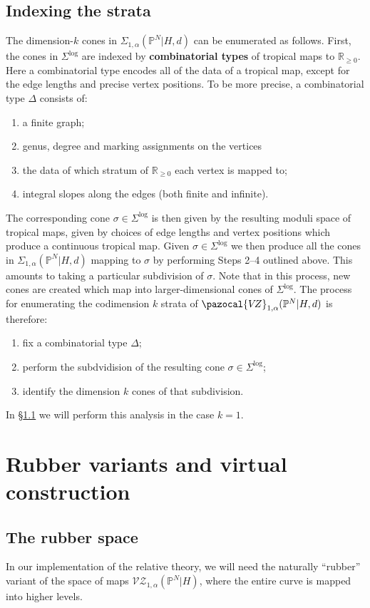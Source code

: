 \documentclass[11pt]{amsart}
\newcommand{\PP}{\mathbb P}
\newcommand{\VZ}{\pazocal{V\!Z}}
\newcommand{\RR}{\mathbb{R}}
\theoremstyle{definition}
\theoremstyle{definition}
\begin{document}
\subsection{Indexing the strata} The dimension-$k$ cones in $\Sigma_{1,\alpha}(\PP^N|H,d)$ can be enumerated as follows. First, the cones in $\Sigma^{\operatorname{log}}$ are indexed by \textbf{combinatorial types} of tropical maps to $\RR_{\geq 0}$. Here a combinatorial type encodes all of the data of a tropical map, except for the edge lengths and precise vertex positions. To be more precise, a combinatorial type $\Delta$ consists of:
\begin{enumerate}
\item a finite graph;
\item genus, degree and marking assignments on the vertices
\item the data of which stratum of $\RR_{\geq 0}$ each vertex is mapped to;
\item integral slopes along the edges (both finite and infinite).
\end{enumerate}
The corresponding cone $\sigma \in \Sigma^{\operatorname{log}}$ is then given by the resulting moduli space of tropical maps, given by choices of edge lengths and vertex positions which produce a continuous tropical map. Given $\sigma\in \Sigma^{\operatorname{log}}$ we then produce all the cones in $\Sigma_{1,\alpha}(\PP^N|H,d)$ mapping to $\sigma$ by performing Steps 2--4 outlined above. This amounts to taking a particular subdivision of $\sigma$. Note that in this process, new cones are created which map into larger-dimensional cones of $\Sigma^{\operatorname{log}}$. The process for enumerating the codimension $k$ strata of $\VZ_{1,\alpha}(\PP^N|H,d)$ is therefore:
\begin{enumerate}
\item fix a combinatorial type $\Delta$;
\item perform the subdvidision of the resulting cone $\sigma \in \Sigma^{\operatorname{log}}$;
\item identify the dimension $k$ cones of that subdivision.
\end{enumerate}
In \S \ref{} we will perform this analysis in the case $k=1$.

\section{Rubber variants and virtual construction}

\subsection{The rubber space} In our implementation of the relative theory, we will need the naturally ``rubber'' variant of the space of maps $
\mathcal{VZ}_{1,\alpha}(\mathbb P^N|H)$, where the entire curve is mapped into higher levels. 
\end{document}
